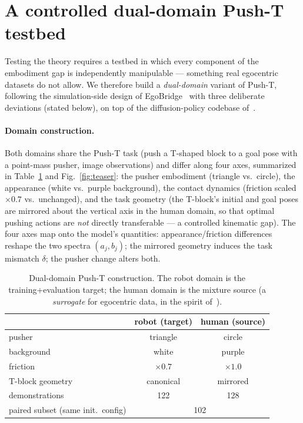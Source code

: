 \section{A controlled dual-domain Push-T testbed}
\label{sec:platform}

Testing the theory requires a testbed in which every component of the embodiment gap is independently manipulable --- something real egocentric datasets do not allow.
We therefore build a \emph{dual-domain} variant of Push-T, following the simulation-side design of EgoBridge~\cite{egobridge2025} with three deliberate deviations (stated below), on top of the diffusion-policy codebase of~\cite{chi2023diffusion}.

\paragraph{Domain construction.}
Both domains share the Push-T task (push a T-shaped block to a goal pose with a point-mass pusher, image observations) and differ along four axes, summarized in Table~\ref{tab:domains} and Fig.~\ref{fig:teaser}: the pusher embodiment (triangle vs.\ circle), the appearance (white vs.\ purple background), the contact dynamics (friction scaled $\times 0.7$ vs.\ unchanged), and the task geometry (the T-block's initial and goal poses are mirrored about the vertical axis in the human domain, so that optimal pushing actions are \emph{not} directly transferable --- a controlled kinematic gap).
The four axes map onto the model's quantities: appearance/friction differences reshape the two spectra $(a_j, b_j)$; the mirrored geometry induces the task mismatch $\delta$; the pusher change alters both.

\begin{table}[t]
  \centering
  \small
  \caption{Dual-domain Push-T construction. The robot domain is the training+evaluation target; the human domain is the mixture source (a \emph{surrogate} for egocentric data, in the spirit of~\cite{egobridge2025}).}
  \label{tab:domains}
  \begin{tabular}{lcc}
    \toprule
     & robot (target) & human (source) \\
    \midrule
    pusher & triangle & circle \\
    background & white & purple \\
    friction & $\times 0.7$ & $\times 1.0$ \\
    T-block geometry & canonical & mirrored \\
    demonstrations & 122 & 128 \\
    paired subset (same init.\ config) & \multicolumn{2}{c}{102} \\
    \bottomrule
  \end{tabular}
\end{table}

